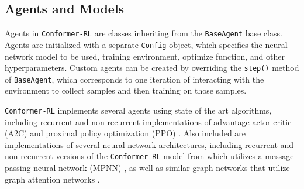 \documentclass[twoside,11pt]{article}
\newcommand{\code}[1]{\texttt{#1}}
\newcommand{\titleofpaper}{Conformer-RL}
\newcommand{\genComment}[2]{\ifnum\comments=1{\color{#1}{\textsf{\footnotesize #2}}}\fi}
\newcommand{\josh}[1]{\genComment{purple}{[JK:#1]}}
\begin{document}

\subsection{Agents and Models}
Agents in \code{\titleofpaper} are classes inheriting from the \code{BaseAgent} base class. Agents are initialized with a separate \code{Config} object, which specifies the neural network model to be used, training environment, optimize function, and other hyperparameters. Custom agents can be created by overriding the \code{step()} method of \code{BaseAgent}, which corresponds to one iteration of interacting with the environment to collect samples and then training on those samples. 

\code{\titleofpaper} implements several agents using state of the art algorithms, including recurrent and non-recurrent implementations of advantage actor critic (A2C) \citep{wu2017a2c} and proximal policy optimization (PPO) \citep{schulman2017ppo}. Also included are implementations of several neural network architectures, including recurrent and non-recurrent versions of the \code{\titleofpaper} model from \citep{gogineni2020torsionnet} which utilizes a message passing neural network (MPNN) \citep{gilmer2017mpnn}, as well as similar graph networks that utilize graph attention networks \citep{gatnn}.
\end{document}
